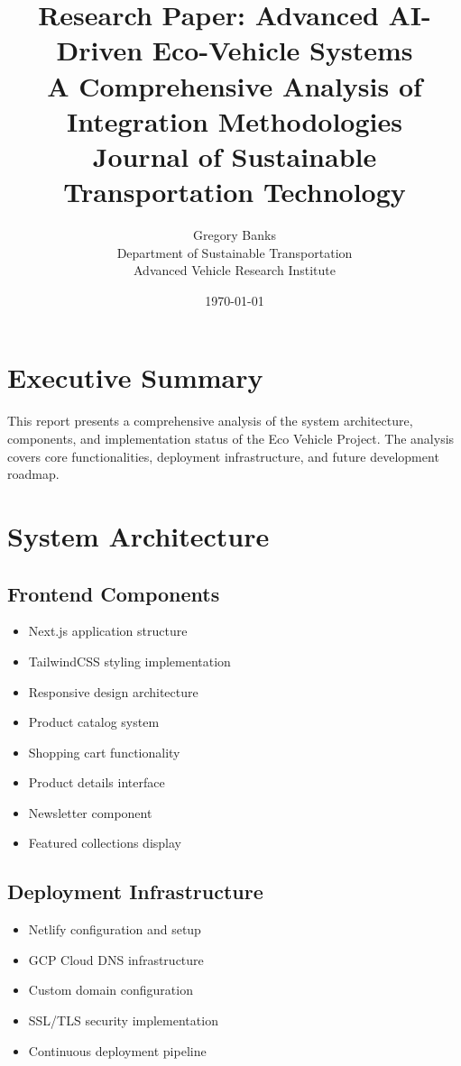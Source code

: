 \documentclass[12pt,a4paper]{article}
\title{Research Paper: Advanced AI-Driven Eco-Vehicle Systems\\[1ex]
A Comprehensive Analysis of Integration Methodologies\\[2ex]
\large Journal of Sustainable Transportation Technology}
\author{Gregory Banks\\Department of Sustainable Transportation\\Advanced Vehicle Research Institute}
\date{\today}
\begin{document}
\maketitle
\tableofcontents
\newpage

\section{Executive Summary}
This report presents a comprehensive analysis of the system architecture, components, and implementation status of the Eco Vehicle Project. The analysis covers core functionalities, deployment infrastructure, and future development roadmap.

\section{System Architecture}
\subsection{Frontend Components}
\begin{itemize}
    \item Next.js application structure
    \item TailwindCSS styling implementation
    \item Responsive design architecture
    \item Product catalog system
    \item Shopping cart functionality
    \item Product details interface
    \item Newsletter component
    \item Featured collections display
\end{itemize}

\subsection{Deployment Infrastructure}
\begin{itemize}
    \item Netlify configuration and setup
    \item GCP Cloud DNS infrastructure
    \item Custom domain configuration
    \item SSL/TLS security implementation
    \item Continuous deployment pipeline
\end{itemize}
\end{document}
